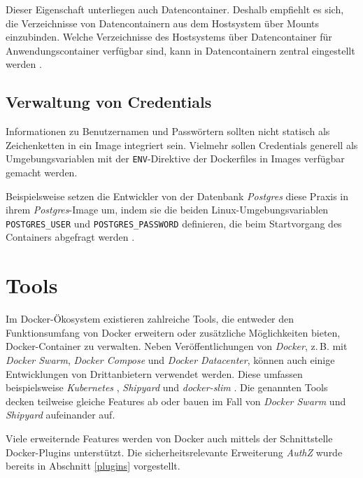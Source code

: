 \documentclass[../main.tex]{subfiles}
\begin{document}
      Dieser Eigenschaft unterliegen auch Datencontainer. Deshalb empfiehlt es sich, die Verzeichnisse von Datencontainern aus dem Hostsystem über Mounts einzubinden. Welche Verzeichnisse des Hostsystems über Datencontainer für Anwendungscontainer verfügbar sind, kann in Datencontainern zentral eingestellt werden \cite{dockerManageDataContainers}.


    \subsection{Verwaltung von Credentials}
      Informationen zu Benutzernamen und Passwörtern sollten nicht statisch als Zeichenketten in ein Image integriert sein. Vielmehr sollen Credentials generell als Umgebungsvariablen mit der \texttt{ENV}-Direktive der Dockerfiles in Images verfügbar gemacht werden.

      Beispielsweise setzen die Entwickler von der Datenbank \emph{Postgres} diese Praxis in ihrem \emph{Postgres}-Image um, indem sie die beiden Linux-Umgebungsvariablen \texttt{POSTGRES\_USER} und \texttt{POSTGRES\_PASSWORD} definieren, die beim Startvorgang des Containers abgefragt werden \cite{dockerHubPostgres}\cite{githubPostgresCredentialCheck}.

  \section{Tools}
    Im Docker-Ökosystem existieren zahlreiche Tools, die entweder den Funktionsumfang von Docker erweitern oder zusätzliche Möglichkeiten bieten, Docker-Container zu verwalten. Neben Veröffentlichungen von \emph{Docker}, z.\,B. mit \emph{Docker Swarm}, \emph{Docker Compose} und \emph{Docker Datacenter}, können auch einige Entwicklungen von Drittanbietern verwendet werden. Diese umfassen beispielsweise \emph{Kubernetes} \cite{kubernetes}, \emph{Shipyard} \cite{shipyard} und \emph{docker-slim} \cite{githubDockerSlim}. Die genannten Tools decken teilweise gleiche Features ab oder bauen im Fall von \emph{Docker Swarm} und \emph{Shipyard} aufeinander auf.

    Viele erweiternde Features werden von Docker auch mittels der Schnittstelle Docker-Plugins unterstützt. Die sicherheitsrelevante Erweiterung \emph{AuthZ} wurde bereits in Abschnitt \ref{plugins} vorgestellt.
\end{document}

